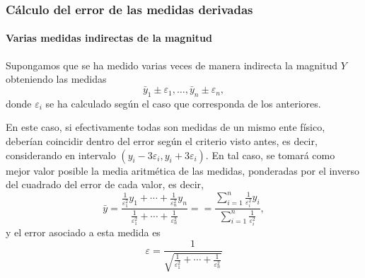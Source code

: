 \begin{frame}
\frametitle{Cálculo del error de las medidas derivadas}
\framesubtitle{Varias medidas indirectas de la magnitud}
Supongamos que se ha medido varias veces de manera indirecta la magnitud $Y$ obteniendo las medidas
\[
\bar y_1\pm \varepsilon_1,\ldots, \bar y_n\pm\varepsilon_n,
\] 
donde $\varepsilon_i$ se ha calculado según el caso que corresponda de los anteriores.

En este caso, si efectivamente todas son medidas de un mismo ente físico, deberían coincidir dentro del error según el
criterio visto antes, es decir, considerando en intervalo $(y_i-3\varepsilon_i,y_i+3\varepsilon_i)$. En tal caso, se
tomará como mejor valor posible la media aritmética de las medidas, ponderadas por el inverso del cuadrado del error de
cada valor, es decir,
\[
\bar y =
\frac{\frac{1}{\varepsilon_1^2}y_1+\cdots+\frac{1}{\varepsilon_n^2}y_n}{\frac{1}{\varepsilon_1^2}+\cdots+\frac{1}{\varepsilon_n^2}}
= =\frac{\sum_{i=1}^n\frac{1}{\varepsilon_i^2}y_i}{\sum_{i=1}^n\frac{1}{\varepsilon_i^2}},
\]
y el error asociado a esta medida es
\[
\varepsilon = \frac{1}{\sqrt{\frac{1}{\varepsilon_1^2}+\cdots+\frac{1}{\varepsilon_n^2}}}
\]
\end{frame}




